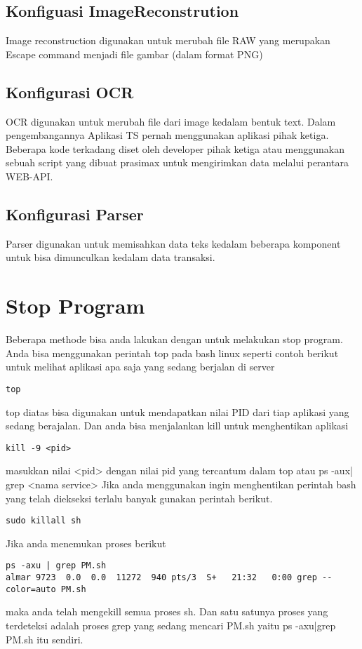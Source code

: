 \documentclass[11pt]{article}
\begin{document}
\subsection{Konfiguasi ImageReconstrution}
\label{sec:org320f557}
Image reconstruction digunakan untuk merubah file RAW yang merupakan Escape command menjadi 
file gambar (dalam format PNG)
\subsection{Konfigurasi OCR}
\label{sec:orgc5806e3}
OCR  digunakan untuk merubah file dari image kedalam bentuk text. Dalam pengembangannya 
Aplikasi TS pernah menggunakan aplikasi pihak ketiga. Beberapa kode terkadang diset oleh 
developer pihak ketiga atau menggunakan sebuah script yang dibuat prasimax untuk mengirimkan
data melalui perantara WEB-API. 
\subsection{Konfigurasi Parser}
\label{sec:org6cc751f}
Parser digunakan untuk memisahkan data teks kedalam beberapa komponent untuk bisa dimunculkan 
kedalam data transaksi.
\section{Stop Program}
\label{sec:org2835a95}
Beberapa methode bisa anda lakukan dengan untuk melakukan stop program. Anda bisa menggunakan
perintah top pada bash linux seperti contoh berikut untuk melihat aplikasi apa saja yang 
sedang berjalan di server
\begin{verbatim}
top
\end{verbatim}
top diatas bisa digunakan untuk mendapatkan nilai PID dari tiap aplikasi yang sedang berajalan.
Dan anda bisa menjalankan kill untuk menghentikan aplikasi 
\begin{verbatim}
kill -9 <pid>
\end{verbatim}
masukkan nilai <pid> dengan nilai pid yang tercantum dalam top atau ps -aux| grep <nama service>
Jika anda menggunakan ingin menghentikan perintah bash yang telah diekseksi terlalu banyak gunakan 
perintah berikut.

\begin{verbatim}
sudo killall sh
\end{verbatim}
Jika anda menemukan proses berikut
\begin{verbatim}
ps -axu | grep PM.sh
almar 9723  0.0  0.0  11272  940 pts/3  S+   21:32   0:00 grep --color=auto PM.sh
\end{verbatim}
maka anda telah mengekill semua proses sh. Dan satu satunya proses yang terdeteksi adalah proses
grep yang sedang mencari PM.sh yaitu ps -axu|grep PM.sh itu sendiri.
\end{document}
